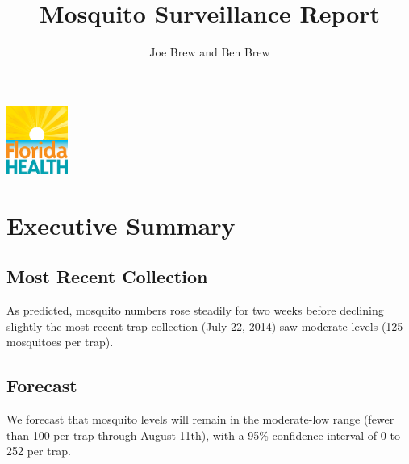 \documentclass{article}
\begin{document}


\title{\textbf{Mosquito Surveillance Report}}
\author{Joe Brew and Ben Brew}


\maketitle
\tableofcontents

\vspace{40mm}

\begin{center}
\includegraphics[width=2cm]{doh}
\end{center}





\fancyhfoffset[E,O]{0pt}


\vspace*{30mm}
\section*{Executive Summary}
\hrulefill




\begin{multicols}{2} 


\subsection*{Most Recent Collection}

As predicted, mosquito numbers rose steadily for two weeks before declining slightly the most recent trap collection (July 22, 2014) saw moderate levels (125 mosquitoes per trap).  

\vfill
\columnbreak



\subsection*{Forecast}

We forecast that mosquito levels will remain in the moderate-low range (fewer than 100 per trap through August 11th), with a 95\% confidence interval of 0 to 252 per trap.  



\end{multicols}
\end{document}
